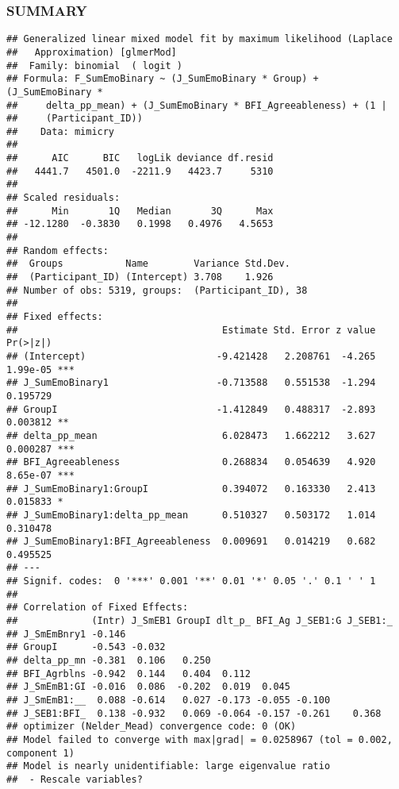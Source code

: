 \documentclass[
]{article}
\begin{document}
\hypertarget{summary}{%
\subsubsection{SUMMARY}\label{summary}}

\begin{verbatim}
## Generalized linear mixed model fit by maximum likelihood (Laplace
##   Approximation) [glmerMod]
##  Family: binomial  ( logit )
## Formula: F_SumEmoBinary ~ (J_SumEmoBinary * Group) + (J_SumEmoBinary *  
##     delta_pp_mean) + (J_SumEmoBinary * BFI_Agreeableness) + (1 |  
##     (Participant_ID))
##    Data: mimicry
## 
##      AIC      BIC   logLik deviance df.resid 
##   4441.7   4501.0  -2211.9   4423.7     5310 
## 
## Scaled residuals: 
##      Min       1Q   Median       3Q      Max 
## -12.1280  -0.3830   0.1998   0.4976   4.5653 
## 
## Random effects:
##  Groups           Name        Variance Std.Dev.
##  (Participant_ID) (Intercept) 3.708    1.926   
## Number of obs: 5319, groups:  (Participant_ID), 38
## 
## Fixed effects:
##                                    Estimate Std. Error z value Pr(>|z|)    
## (Intercept)                       -9.421428   2.208761  -4.265 1.99e-05 ***
## J_SumEmoBinary1                   -0.713588   0.551538  -1.294 0.195729    
## GroupI                            -1.412849   0.488317  -2.893 0.003812 ** 
## delta_pp_mean                      6.028473   1.662212   3.627 0.000287 ***
## BFI_Agreeableness                  0.268834   0.054639   4.920 8.65e-07 ***
## J_SumEmoBinary1:GroupI             0.394072   0.163330   2.413 0.015833 *  
## J_SumEmoBinary1:delta_pp_mean      0.510327   0.503172   1.014 0.310478    
## J_SumEmoBinary1:BFI_Agreeableness  0.009691   0.014219   0.682 0.495525    
## ---
## Signif. codes:  0 '***' 0.001 '**' 0.01 '*' 0.05 '.' 0.1 ' ' 1
## 
## Correlation of Fixed Effects:
##             (Intr) J_SmEB1 GroupI dlt_p_ BFI_Ag J_SEB1:G J_SEB1:_
## J_SmEmBnry1 -0.146                                               
## GroupI      -0.543 -0.032                                        
## delta_pp_mn -0.381  0.106   0.250                                
## BFI_Agrblns -0.942  0.144   0.404  0.112                         
## J_SmEmB1:GI -0.016  0.086  -0.202  0.019  0.045                  
## J_SmEmB1:__  0.088 -0.614   0.027 -0.173 -0.055 -0.100           
## J_SEB1:BFI_  0.138 -0.932   0.069 -0.064 -0.157 -0.261    0.368  
## optimizer (Nelder_Mead) convergence code: 0 (OK)
## Model failed to converge with max|grad| = 0.0258967 (tol = 0.002, component 1)
## Model is nearly unidentifiable: large eigenvalue ratio
##  - Rescale variables?
\end{verbatim}
\end{document}
